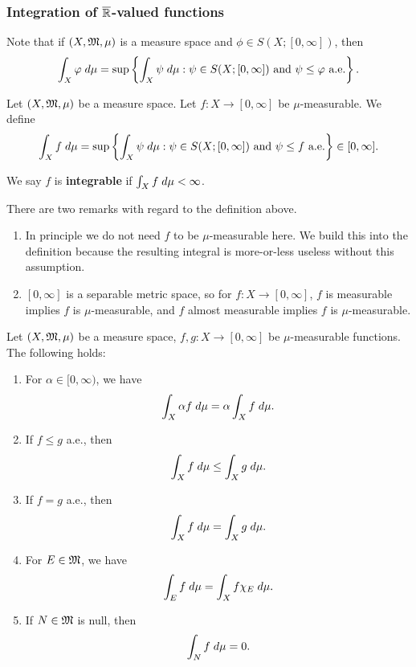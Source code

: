 \documentclass[a4paper]{article}
\begin{document}
\subsubsection{Integration of $\overline{\mathbb{R}}$-valued functions}

Note that if $(X, \mathfrak{M}, \mu)$ is a measure space and
$\phi \in S(X; [0, \infty])$, then
\[
\int_X \varphi \; d\mu =
\sup \left\{ \int_X \psi \; d\mu :
\psi \in S(X; [0, \infty]) \text{ and $\psi \leq \varphi$
a.e.} \right\}.
\]

\begin{defi}
  Let $(X, \mathfrak{M}, \mu)$ be a measure space. Let
  $f : X \to [0, \infty]$ be $\mu$-measurable. We
  define
  \[
  \int_X f \; d\mu =
  \sup \left\{ \int_X \psi \; d\mu:
  \text{$\psi \in S(X; [0, \infty])$ and
  $\psi \leq f$ a.e.} \right\}
  \in [0, \infty].
  \]

  We say $f$ is \textbf{integrable} if $\int_X f \; d \mu <
  \infty$.
\end{defi}

\begin{remark}
There are two remarks with regard to the definition
above.
\begin{enumerate}
  \item In principle we do not need $f$ to be $\mu$-measurable
  here. We build this into the definition because the
  resulting integral is more-or-less useless without this
  assumption.
  \item $[0, \infty]$ is a separable metric space,
  so for $f : X \to [0, \infty]$,
  $f$ is measurable implies $f$ is $\mu$-measurable,
  and $f$ almost measurable implies $f$ is $\mu$-measurable.
\end{enumerate}
\end{remark}

\begin{thm}
Let $(X, \mathfrak{M}, \mu)$ be a measure space, $f, g : X \to [0, \infty]$
be $\mu$-measurable functions. The following holds:
\begin{enumerate}
  \item For $\alpha \in [0, \infty)$, we have
  \[
  \int_X \alpha f \; d \mu = \alpha \int_X f \; d \mu.
  \]
  \item If $f \leq g$ a.e., then
  \[
  \int_X f \; d \mu \leq \int_X g \; d \mu.
  \]
  \item If $f = g$ a.e., then
  \[
  \int_X f \; d \mu = \int_X g \; d \mu.
  \]
  \item For $E \in \mathfrak{M}$, we have
  \[
  \int_E f \; d \mu = \int_X f \chi_E \; d \mu.
  \]
  \item If $N \in \mathfrak{M}$ is null, then
  \[
  \int_N f \; d \mu = 0.
  \]
\end{enumerate}
\end{thm}
\end{document}
